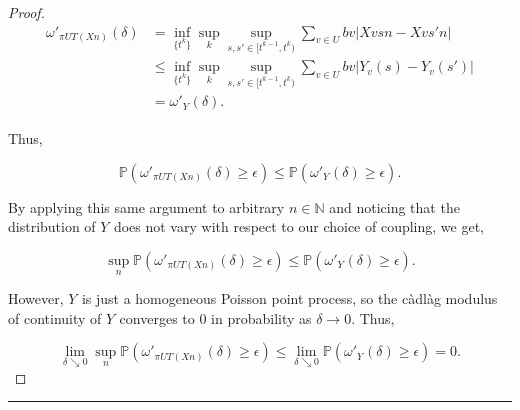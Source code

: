 \documentclass[12pt]{article}
\newcommand{\mb}{\mathbb}
\newcommand{\ra}{\rightarrow}
\newcommand{\ep}{\epsilon}
\newcommand{\lin}{\rule{\linewidth}{0.4 pt}}
\newcommand{\pr}{\mb{P}}							%
\renewcommand{\v}{v}							%
\renewcommand{\U}{U}							%
\renewcommand{\b}{b}							%
\newcommand{\T}{T}								%
\renewcommand{\t}{t}							%
\newcommand{\proj}{\pi}							%
\renewcommand{\tt}{s}							%
\newcommand{\ttt}{s'}							%
\newcommand{\X}{X}								%
\newcommand{\pup}[1]{^{#1}}							%
\renewcommand{\it}{k}								%
\newcommand{\numb}{n}								%
\newcommand{\rxvtt}[2]{Y_{#1}{(#2)}}				%
\newcommand{\rxvtts}[2]{Y_{#1}{#2}}					%
\begin{document}
\begin{proof}
\begin{align*}
\omega'_{\proj{\U}{\T}\left(\X{}{}{\numb}\right)}(\delta) &= \inf_{\{\t\pup{\it}\}}\sup_\it\sup_{\tt,\ttt \in [\t\pup{\it-1},\t\pup{\it})} \sum_{\v\in \U} \b{\v}|\X{\v}{\tt}{\numb} - \X{\v}{\ttt}{\numb}|\\
&\leq \inf_{\{\t\pup{\it}\}}\sup_\it\sup_{\tt,\ttt \in [\t\pup{\it-1},\t\pup{\it})} \sum_{\v\in \U} \b{\v}|\rxvtt{\v}{\tt} - \rxvtt{\v}{\ttt}|\\
&= \omega'_{\rxvtts{}{}}(\delta).
\end{align*}

Thus,

\[\pr\left(\omega'_{\proj{\U}{\T}\left(\X{}{}{\numb}\right)}(\delta) \geq \ep\right) \leq \pr\left(\omega'_{\rxvtts{}{}}(\delta) \geq \ep\right).\]

By applying this same argument to arbitrary \(\numb\in \mb{N}\) and noticing that the distribution of \(\rxvtts{}{}\) does not vary with respect to our choice of coupling, we get,

\[\sup_{\numb}\pr\left(\omega'_{\proj{\U}{\T}\left(\X{}{}{\numb}\right)}(\delta)\geq \ep\right) \leq \pr\left(\omega'_{\rxvtts{}{}}(\delta) \geq \ep\right).\]

However, \(\rxvtts{}{}\) is just a homogeneous Poisson point process, so the c\`adl\`ag modulus of continuity of \(\rxvtts{}{}\) converges to 0 in probability as \(\delta \ra 0\). Thus,

\[\lim_{\delta \searrow 0}\sup_{\numb}\pr\left(\omega'_{\proj{\U}{\T}\left(\X{}{}{\numb}\right)}(\delta) \geq \ep\right) \leq \lim_{\delta\searrow 0}\pr\left(\omega'_{\rxvtts{}{}}(\delta)\geq \ep\right) = 0.\]


\end{proof}

\lin
\end{document}
